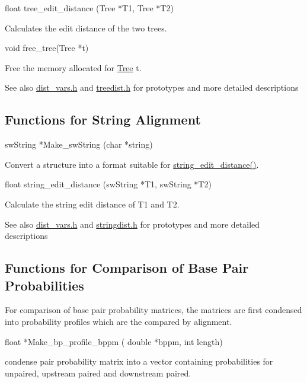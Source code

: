 \begin{DoxyVerb}float   tree_edit_distance (Tree *T1,
                            Tree *T2) 
\end{DoxyVerb}
 Calculates the edit distance of the two trees.

\begin{DoxyVerb}void    free_tree(Tree *t)
\end{DoxyVerb}
 Free the memory allocated for \hyperlink{structTree}{Tree} t.

\begin{DoxySeeAlso}{See also}
\hyperlink{dist__vars_8h}{dist\+\_\+vars.\+h} and \hyperlink{treedist_8h}{treedist.\+h} for prototypes and more detailed descriptions
\end{DoxySeeAlso}
\hypertarget{distance_measures_sec_string_alignment}{}\subsection{Functions for String Alignment}\label{distance_measures_sec_string_alignment}
\begin{DoxyVerb}swString *Make_swString (char *string)
\end{DoxyVerb}
 Convert a structure into a format suitable for \hyperlink{stringdist_8h_a89e3c335ef17780576d7c0e713830db9}{string\+\_\+edit\+\_\+distance()}.

\begin{DoxyVerb}float     string_edit_distance (swString *T1,
                                swString *T2)
\end{DoxyVerb}
 Calculate the string edit distance of T1 and T2.

\begin{DoxySeeAlso}{See also}
\hyperlink{dist__vars_8h}{dist\+\_\+vars.\+h} and \hyperlink{stringdist_8h}{stringdist.\+h} for prototypes and more detailed descriptions
\end{DoxySeeAlso}
\hypertarget{distance_measures_sec_compare_base_pair_probs}{}\subsection{Functions for Comparison of Base Pair Probabilities}\label{distance_measures_sec_compare_base_pair_probs}
For comparison of base pair probability matrices, the matrices are first condensed into probability profiles which are the compared by alignment.

\begin{DoxyVerb}float *Make_bp_profile_bppm ( double *bppm,
                              int length)
\end{DoxyVerb}
 condense pair probability matrix into a vector containing probabilities for unpaired, upstream paired and downstream paired.

